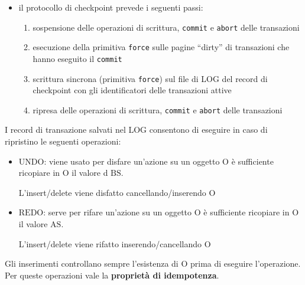 \begin{itemize}[label=$\triangleright$, itemsep=\medskipamount]
\begin{itemize}[label=$\circ$, itemsep=\smallskipamount]
\begin{itemize}[itemsep=\smallskipamount]
      \item il protocollo di checkpoint prevede i seguenti passi:
      \begin{enumerate}[itemsep=\smallskipamount]
        \item sospensione delle operazioni di scrittura, \texttt{commit} e \texttt{abort} delle transazioni
        \item esecuzione della primitiva \texttt{force} sulle pagine ``dirty'' di transazioni che hanno eseguito il \texttt{commit}
        \item scrittura sincrona (primitiva \texttt{force}) sul file di LOG del record di checkpoint con gli identificatori delle transazioni attive
        \item ripresa delle operazioni di scrittura, \texttt{commit} e \texttt{abort} delle transazioni
      \end{enumerate}
    \end{itemize}
  \end{itemize}
\end{itemize}

I record di transazione salvati nel LOG consentono di eseguire in caso di ripristino le seguenti operazioni:
\begin{itemize}[label=$\triangleright$, itemsep=\smallskipamount]
  \item $\boldsymbol{\mathrm{UNDO}}$: viene usato per disfare un'azione su un oggetto $\mathrm{O}$ è sufficiente ricopiare in $\mathrm{O}$ il valore d $\mathrm{BS}$.
  
  L'insert/delete viene disfatto cancellando/inserendo $\mathrm{O}$
  \item $\boldsymbol{\mathrm{REDO}}$: serve per rifare un'azione su un oggetto $\mathrm{O}$ è sufficiente ricopiare in $\mathrm{O}$ il valore $\mathrm{AS}$.
  
  L'insert/delete viene rifatto inserendo/cancellando $\mathrm{O}$
\end{itemize}

\medskip
Gli inserimenti controllano sempre l’esistenza di $\mathrm{O}$ prima di eseguire l'operazione.\\[0.2ex]
Per queste operazioni vale la \textbf{proprietà di idempotenza}.


